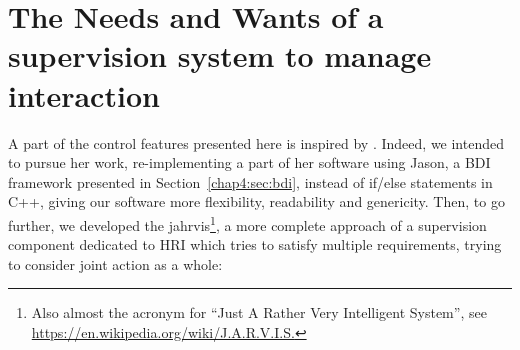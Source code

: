 \documentclass[a4paper,11pt,twoside]{StyleThese}
\begin{document}
\section{The Needs and Wants of a supervision system to manage interaction} %


A part of the control features presented here is inspired by \cite{devin_2017_decisional}. Indeed, we intended to pursue her work, re-implementing a part of her software using Jason, a BDI framework presented in Section~\ref{chap4:sec:bdi}, instead of if/else statements in C++, giving our software more flexibility, readability and genericity.
Then, to go further, we developed the \acrfull{jahrvis}\footnote{Also almost the acronym for ``Just A Rather Very Intelligent System'', see \url{https://en.wikipedia.org/wiki/J.A.R.V.I.S.}}, a more complete approach of a supervision component dedicated to HRI which tries to satisfy multiple requirements, trying to consider joint action as a whole:
\end{document}
